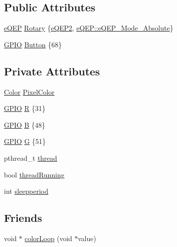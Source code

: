\subsection*{Public Attributes}
\begin{DoxyCompactItemize}
\item 
\hyperlink{class_hardware_1_1e_q_e_p}{e\+Q\+E\+P} \hyperlink{class_hardware_1_1_e_c12_p_abfe8d6ea8948c77d4866ca8a05dbebe9}{Rotary} \{\hyperlink{eqep_8h_a2dfbafc696aef9c14226ce25fb77c5f1}{e\+Q\+E\+P2}, \hyperlink{class_hardware_1_1e_q_e_p_a3f97f26c64d49d6f2643a257b7249070a5e916ce9f21af5bd9c5c63609630df7e}{e\+Q\+E\+P\+::e\+Q\+E\+P\+\_\+\+Mode\+\_\+\+Absolute}\}
\item 
\hyperlink{class_hardware_1_1_g_p_i_o}{G\+P\+I\+O} \hyperlink{class_hardware_1_1_e_c12_p_a6d91a7b1767f080af8c33bacdae1dd1d}{Button} \{68\}
\end{DoxyCompactItemize}
\subsection*{Private Attributes}
\begin{DoxyCompactItemize}
\item 
\hyperlink{class_hardware_1_1_e_c12_p_a8341f410cd939bf03160fe239bc782aa}{Color} \hyperlink{class_hardware_1_1_e_c12_p_a1bc6223c152c6d9f30304b92069f05c0}{Pixel\+Color}
\item 
\hyperlink{class_hardware_1_1_g_p_i_o}{G\+P\+I\+O} \hyperlink{class_hardware_1_1_e_c12_p_a0a4f03a37d709349994e800e44f5c781}{R} \{31\}
\item 
\hyperlink{class_hardware_1_1_g_p_i_o}{G\+P\+I\+O} \hyperlink{class_hardware_1_1_e_c12_p_a326f00b2047ecb58ee1e7e894dc61ad3}{B} \{48\}
\item 
\hyperlink{class_hardware_1_1_g_p_i_o}{G\+P\+I\+O} \hyperlink{class_hardware_1_1_e_c12_p_a7afd63c14e12d861c8b20614ef34d70e}{G} \{51\}
\item 
pthread\+\_\+t \hyperlink{class_hardware_1_1_e_c12_p_a718a90836ff46cd71d18ce099a656533}{thread}
\item 
bool \hyperlink{class_hardware_1_1_e_c12_p_a81af8167f5a5192d8575ebad04952d57}{thread\+Running}
\item 
int \hyperlink{class_hardware_1_1_e_c12_p_adff7ed51fd97bac61075c88a06102348}{sleepperiod}
\end{DoxyCompactItemize}
\subsection*{Friends}
\begin{DoxyCompactItemize}
\item 
void $\ast$ \hyperlink{class_hardware_1_1_e_c12_p_ae57007919c8fb89fc45e952de846c90e}{color\+Loop} (void $\ast$value)
\end{DoxyCompactItemize}


